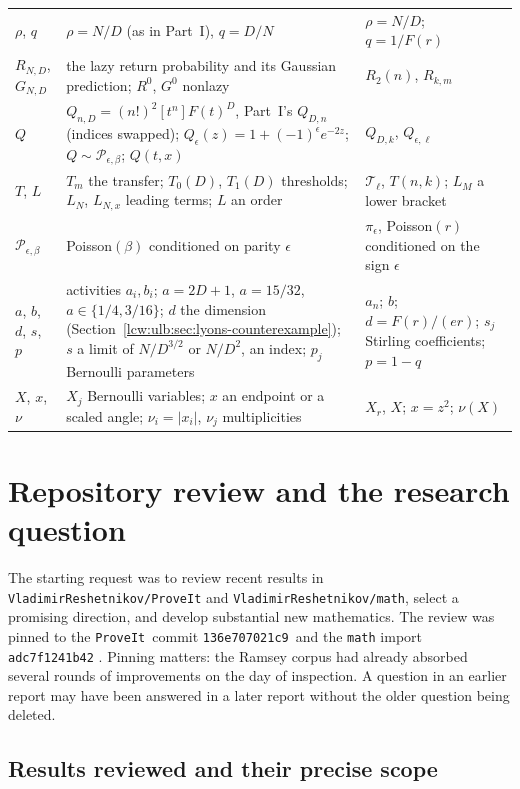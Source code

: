 \documentclass[11pt,letterpaper]{article}
\theoremstyle{remark}\newtheorem{remark}[theorem]{Remark}
\newcommand{\TT}{\mathcal T}\newcommand{\PP}{\mathcal P}
\newcommand{\repo}{\texttt{ProveIt}}
\newcommand{\sourcepin}{\texttt{136e707021c9}}
\begin{document}
\begin{longtable}{@{}>{\raggedright\arraybackslash}p{0.95in}>{\raggedright\arraybackslash}p{3.15in}>{\raggedright\arraybackslash}p{2.05in}@{}}
$\rho$, $q$ & $\rho=N/D$ (as in Part~I), $q=D/N$ & $\rho=N/D$; $q=1/F(r)$\\
$R_{N,D}$, $G_{N,D}$ & the lazy return probability and its Gaussian prediction; $R^0$, $G^0$ nonlazy & $R_2(n)$, $R_{k,m}$\\
$Q$ & $Q_{n,D}=(n!)^2[t^n]F(t)^D$, Part~I's $Q_{D,n}$ (indices swapped); $Q_\epsilon(z)=1+(-1)^\epsilon e^{-2z}$; $Q\sim\mathcal P_{\epsilon,\beta}$; $Q(t,x)$ & $Q_{D,k}$, $Q_{\epsilon,\ell}$\\
$T$, $L$ & $T_m$ the transfer; $T_0(D)$, $T_1(D)$ thresholds; $L_N$, $L_{N,x}$ leading terms; $L$ an order & $\TT_\ell$, $T(n,k)$; $L_M$ a lower bracket\\
$\mathcal P_{\epsilon,\beta}$ & Poisson$(\beta)$ conditioned on parity $\epsilon$ & $\pi_\epsilon$, Poisson$(r)$ conditioned on the sign $\epsilon$\\
$a$, $b$, $d$, $s$, $p$ & activities $a_i,b_i$; $a=2D+1$, $a=15/32$, $a\in\{1/4,3/16\}$; $d$ the dimension (Section~\ref{lcw:ulb:sec:lyons-counterexample}); $s$ a limit of $N/D^{3/2}$ or $N/D^2$, an index; $p_j$ Bernoulli parameters & $a_n$; $b$; $d=F(r)/(er)$; $s_j$ Stirling coefficients; $p=1-q$\\
$X$, $x$, $\nu$ & $X_j$ Bernoulli variables; $x$ an endpoint or a scaled angle; $\nu_i=|x_i|$, $\nu_j$ multiplicities & $X_r$, $X$; $x=z^2$; $\nu(X)$\\
\bottomrule
\end{longtable}
\addtocounter{table}{-1}%
\endgroup

\section{Repository review and the research question}
\label{lcw:ulb:sec:context}

The starting request was to review recent results in
\texttt{VladimirReshetnikov/ProveIt} and
\texttt{VladimirReshetnikov/math}, select a promising direction, and develop
substantial new mathematics. The review was pinned to the \repo\ commit
\sourcepin\ and the \texttt{math} import
\texttt{adc7f1241b42} \cite{proveit,mathrepo}. Pinning matters: the Ramsey
corpus had already absorbed several rounds of improvements on the day of
inspection. A question in an earlier report may have been answered in a
later report without the older question being deleted.

\subsection{Results reviewed and their precise scope}
\end{document}
